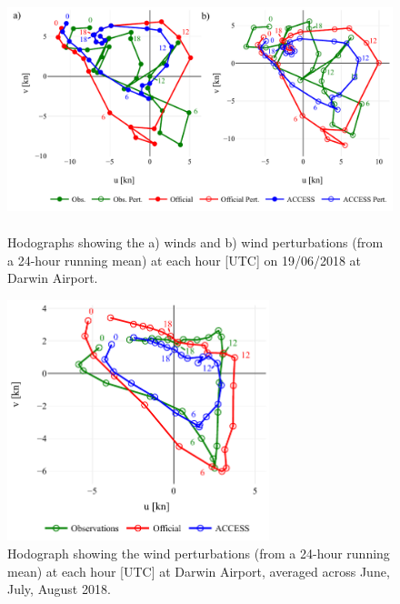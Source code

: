 \documentclass[alpha-refs]{wiley-article}
\begin{document}
\begin{figure}
\centering
\includegraphics[keepaspectratio=true, height=7cm]{daily_winds_darwin_AP.pdf}
\caption{Hodographs showing the a) winds and b) wind perturbations (from a 24-hour running mean) at each hour [UTC] on 19/06/2018 at Darwin Airport.}
\label{Fig:airport_wpi_access}
\end{figure}

\begin{figure}
\centering
\includegraphics[keepaspectratio=true,height=7cm]{clim_winds_austral_winter_ACCESS.pdf}
\caption{Hodograph showing the wind perturbations (from a 24-hour running mean) at each hour [UTC] at Darwin Airport, averaged across June, July, August 2018.}
\label{Fig:airport_wpi_access}
\end{figure}
\end{document}
